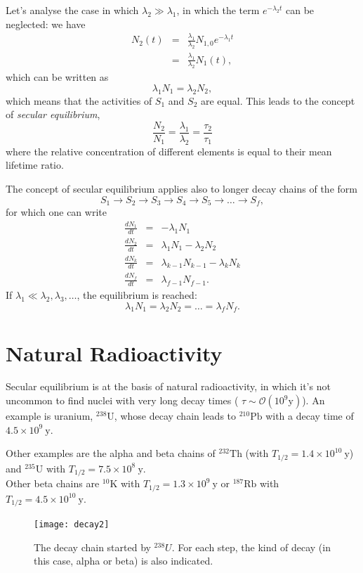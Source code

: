 Let's analyse the case in which $\lambda_2 \gg \lambda_1$, in which the term $e^{-\lambda_2 t}$ can be neglected: we have
\begin{eqnarray*}
  N_2(t) &=& \frac{\lambda_1}{\lambda_2} N_{1,0} e^{-\lambda_1 t}\\
  &=& \frac{\lambda_1}{\lambda_2} N_1(t),
\end{eqnarray*}
which can be written as
\[\lambda_1 N_1 = \lambda_2 N_2,\]
which means that the activities of $S_1$ and $S_2$ are equal. This leads to the concept of \emph{secular equilibrium},
\[\frac{N_2}{N_1} = \frac{\lambda_1}{\lambda_2} = \frac{\tau_2}{\tau_1}\]
where the relative concentration of different elements is equal to their mean lifetime ratio.

The concept of secular equilibrium applies also to longer decay chains of the form
\[S_1\rightarrow S_2\rightarrow S_3\rightarrow S_4\rightarrow S_5\rightarrow \dots \rightarrow  S_f,\]
for which one can write
\begin{eqnarray*}
  \frac{dN_1}{dt} &=& -\lambda_1 N_1\\
  \frac{dN_2}{dt} &=& \lambda_1 N_1 - \lambda_2N_2\\
  \frac{dN_k}{dt} &=& \lambda_{k-1} N_{k-1} - \lambda_kN_k\\
  \frac{dN_f}{dt} &=& \lambda_{f-1} N_{f-1}.
\end{eqnarray*}
If $\lambda_1 \ll \lambda_2,\lambda_3,\dots$, the equilibrium is reached:
\[\lambda_1 N_1 = \lambda_2 N_2 = \dots = \lambda_f N_f .\]

\section{Natural Radioactivity}
Secular equilibrium is at the basis of natural radioactivity, in which it's not uncommon to find nuclei with very long decay times ( $\tau \sim \mathcal{O}(10^9 \text{y})$). An example is uranium, $^{238}\text{U}$, whose decay chain leads to $^{210}\text{Pb}$ with a decay time of $4.5 \times 10^9\ \text{y}$.

Other examples are the alpha and beta chains of $^{232}\text{Th}$ (with $T_{1/2} = 1.4\times 10^{10}\ \text{y}$) and $^{235}\text{U}$ with $T_{1/2} = 7.5\times 10^{8}\ \text{y}$.\\

Other beta chains are  $^{10}\text{K}$ with $T_{1/2} = 1.3\times 10^{9}\ \text{y}$ or  $^{187}\text{Rb}$ with $T_{1/2} = 4.5\times 10^{10}\ \text{y}$.

\begin{figure}
  \texttt{[image: decay2]}
\caption{The decay chain started by \(^{238}U\). For each step, the kind of decay (in this case, alpha or beta) is also indicated.}  \label{fig:decay2}
\end{figure}



